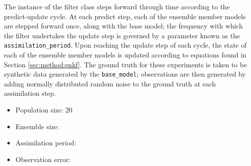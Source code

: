 The instance of the filter class steps forward through time according to the
predict-update cycle.
At each predict step, each of the ensemble member models are stepped forward
once, along with the base model; the frequency with which the filter undertakes
the update step is governed by a parameter known as the
\texttt{assimilation\_period}.
Upon reaching the update step of each cycle, the state of each of the ensemble
member models is updated according to equations found in Section
\ref{sec:method:enkf}.
The ground truth for these experiments is taken to be synthetic data generated
by the \texttt{base\_model}; observations are then generated by adding normally
distributed random noise to the ground truth at each assimilation step.

\begin{itemize}
    \item Population size: 20
    \item Ensemble size:
    \item Assimilation period:
    \item Observation error:
\end{itemize}



